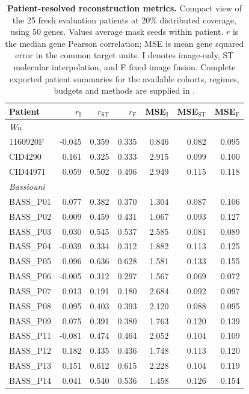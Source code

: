 \begin{table}[p]
\caption{\textbf{Patient-resolved reconstruction metrics.} Compact view of the 25 fresh evaluation patients at 20\% distributed coverage, using 50 genes. Values average mask seeds within patient. $r$ is the median gene Pearson correlation; MSE is mean gene squared error in the common target units. I denotes image-only, ST molecular interpolation, and F fixed image fusion. Complete exported patient summaries for the available cohorts, regimes, budgets and methods are supplied in \protect{}.}
\centering\small
\begin{tabular}{lrrrrrr}\toprule
Patient & $r_{\mathrm I}$ & $r_{\mathrm{ST}}$ & $r_{\mathrm F}$ & MSE$_{\mathrm I}$ & MSE$_{\mathrm{ST}}$ & MSE$_{\mathrm F}$\\\midrule
\multicolumn{7}{l}{\textit{Wu}}\\
1160920F & -0.045 & 0.359 & 0.335 & 0.846 & 0.082 & 0.095\\
CID4290 & 0.161 & 0.325 & 0.333 & 2.915 & 0.099 & 0.100\\
CID44971 & 0.059 & 0.502 & 0.496 & 2.949 & 0.115 & 0.118\\
\multicolumn{7}{l}{\textit{Bassiouni}}\\
BASS\_P01 & 0.077 & 0.382 & 0.370 & 1.304 & 0.087 & 0.106\\
BASS\_P02 & 0.009 & 0.459 & 0.431 & 1.067 & 0.093 & 0.127\\
BASS\_P03 & 0.030 & 0.545 & 0.537 & 2.585 & 0.081 & 0.089\\
BASS\_P04 & -0.039 & 0.334 & 0.312 & 1.882 & 0.113 & 0.125\\
BASS\_P05 & 0.096 & 0.636 & 0.628 & 1.581 & 0.133 & 0.155\\
BASS\_P06 & -0.005 & 0.312 & 0.297 & 1.567 & 0.069 & 0.072\\
BASS\_P07 & 0.013 & 0.191 & 0.180 & 2.684 & 0.092 & 0.097\\
BASS\_P08 & 0.095 & 0.403 & 0.393 & 2.120 & 0.088 & 0.095\\
BASS\_P09 & 0.075 & 0.391 & 0.380 & 1.763 & 0.120 & 0.139\\
BASS\_P11 & -0.081 & 0.474 & 0.464 & 2.052 & 0.104 & 0.109\\
BASS\_P12 & 0.182 & 0.435 & 0.436 & 1.748 & 0.113 & 0.120\\
BASS\_P13 & 0.151 & 0.612 & 0.615 & 2.228 & 0.104 & 0.119\\
BASS\_P14 & 0.041 & 0.540 & 0.536 & 1.458 & 0.126 & 0.154\\

\end{tabular}
\end{table}
